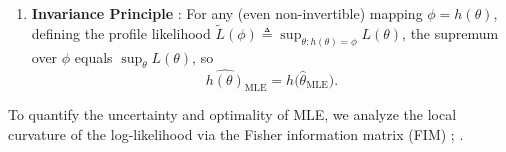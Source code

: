 \documentclass[../../../../master.tex]{subfiles}
\begin{document}
\begin{coremath}
\begin{enumerate}
\begin{itemize}
  \end{itemize}
  \item \textbf{Invariance Principle} : For any (even non-invertible) mapping $\phi = h(\theta)$, defining the profile likelihood $\tilde{L}(\phi) \triangleq \sup_{\theta : h(\theta) = \phi} L(\theta)$, the supremum over $\phi$ equals $\sup_\theta L(\theta)$, so
  \begin{equation}
  \widehat{h(\theta)}_{\mathrm{MLE}} = h\bigl(\hat{\theta}_{\mathrm{MLE}}\bigr).
  \end{equation}
\end{enumerate}
\end{coremath}

To quantify the uncertainty and optimality of MLE, we analyze the local curvature of the log-likelihood via the Fisher information matrix (FIM) ; .
\end{document}
